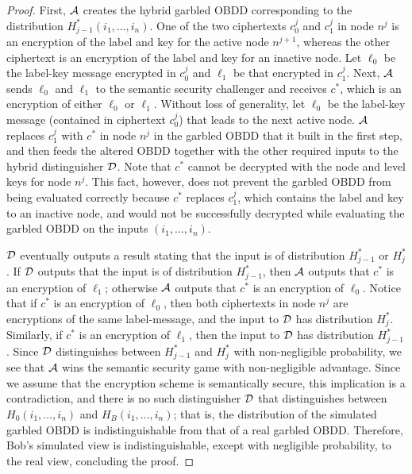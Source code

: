 \begin{proof}
First, ${\mathcal{A}}$ creates the hybrid garbled OBDD corresponding to the
distribution $H^*_{j-1}(i_1,\ldots,i_n)$. One of the two ciphertexts
$c^{j}_0$ and $c^{j}_1$ in node $n^j$ is an encryption of the label
and key for the active node $n^{j+1}$, whereas the other ciphertext is
an encryption of the label and key for an inactive node. Let $\ell_0$
be the label-key message encrypted in $c^j_0$ and $\ell_1$ be that
encrypted in $c^j_1$. Next, ${\mathcal{A}}$ sends $\ell_0$ and $\ell_1$ to
the semantic security challenger and receives $c^*$, which is an
encryption of either $\ell_0$ or $\ell_1$. Without loss of generality,
let $\ell_0$ be the label-key message (contained in ciphertext
$c^{j}_0$) that leads to the next active node. ${\mathcal{A}}$ replaces
$c^j_1$ with $c^*$ in node $n^j$ in the garbled OBDD that it built in
the first step, and then feeds the altered OBDD together with the other
required inputs to the hybrid distinguisher ${\mathcal{D}}$. Note that
$c^*$ cannot be decrypted with the node and level keys for node
$n^j$. This fact, however, does not prevent the garbled OBDD from being
evaluated correctly because $c^*$ replaces $c^j_1$, which contains the
label and key to an inactive node, and would not be successfully
decrypted while evaluating the garbled OBDD on the inputs
$(i_1,\ldots,i_n)$.

${\mathcal{D}}$ eventually outputs a result stating that the input is of
distribution $H^*_{j-1}$ or $H^*_{j}$. If ${\mathcal{D}}$ outputs that the
input is of distribution $H^*_{j-1}$, then ${\mathcal{A}}$ outputs that $c^*$
is an encryption of $\ell_1$; otherwise ${\mathcal{A}}$ outputs that $c^*$ is
an encryption of $\ell_0$. Notice that if $c^*$ is an encryption of
$\ell_0$, then both ciphertexts in node $n^j$ are encryptions of the
same label-message, and the input to ${\mathcal{D}}$ has distribution
$H^*_{j}$. Similarly, if $c^*$ is an encryption of $\ell_1$, then the
input to ${\mathcal{D}}$ has distribution $H^*_{j-1}$. Since ${\mathcal{D}}$
distinguishes between $H^*_{j-1}$ and $H^*_{j}$ with non-negligible
probability, we see that ${\mathcal{A}}$ wins the semantic security game with
non-negligible advantage. Since we assume that the encryption scheme is
semantically secure, this implication is a contradiction, and there is
no such distinguisher ${\mathcal{D}}$ that distinguishes between
$H_0(i_1,\ldots,i_n)$ and $H_{B}(i_1,\ldots,i_n)$; that is, the
distribution of the simulated garbled OBDD is indistinguishable from
that of a real garbled OBDD. Therefore, Bob's simulated view is
indistinguishable, except with negligible probability, to the real
view, concluding the proof.
\end{proof}
